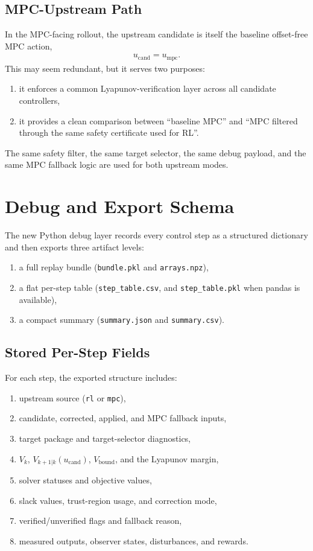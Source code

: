 \documentclass[11pt]{article}
\begin{document}
\subsection{MPC-Upstream Path}
In the MPC-facing rollout, the upstream candidate is itself the baseline offset-free MPC action,
\begin{align}
u_{\mathrm{cand}} = u_{\mathrm{mpc}}.
\end{align}
This may seem redundant, but it serves two purposes:
\begin{enumerate}[leftmargin=*]
\item it enforces a common Lyapunov-verification layer across all candidate controllers,
\item it provides a clean comparison between ``baseline MPC'' and ``MPC filtered through the same safety certificate used for RL''.
\end{enumerate}
The same safety filter, the same target selector, the same debug payload, and the same MPC fallback logic are used for both upstream modes.

\section{Debug and Export Schema}
The new Python debug layer records every control step as a structured dictionary and then exports three artifact levels:
\begin{enumerate}[leftmargin=*]
\item a full replay bundle (\texttt{bundle.pkl} and \texttt{arrays.npz}),
\item a flat per-step table (\texttt{step\_table.csv}, and \texttt{step\_table.pkl} when pandas is available),
\item a compact summary (\texttt{summary.json} and \texttt{summary.csv}).
\end{enumerate}

\subsection{Stored Per-Step Fields}
For each step, the exported structure includes:
\begin{enumerate}[leftmargin=*]
\item upstream source (\texttt{rl} or \texttt{mpc}),
\item candidate, corrected, applied, and MPC fallback inputs,
\item target package and target-selector diagnostics,
\item $V_k$, $V_{k+1|k}(u_{\mathrm{cand}})$, $V_{\mathrm{bound}}$, and the Lyapunov margin,
\item solver statuses and objective values,
\item slack values, trust-region usage, and correction mode,
\item verified/unverified flags and fallback reason,
\item measured outputs, observer states, disturbances, and rewards.
\end{enumerate}
\end{document}
